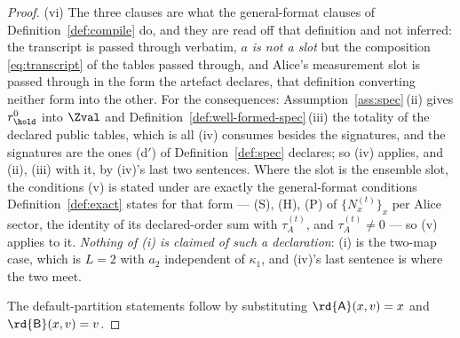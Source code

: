 \begin{proof}
(vi) The three clauses are what the general-format clauses of
Definition~\ref{def:compile} do, and they are read off that definition and
not inferred: the transcript is passed through verbatim, \emph{$a$ is not a
slot} but the composition \eqref{eq:transcript} of the tables passed through,
and Alice's measurement slot is passed through in the form the artefact
declares, that definition converting neither form into the other. For the
consequences: Assumption~\ref{ass:spec}\,(ii) gives $r^{0}_{\hold}$ into
$\Zval$ and Definition~\ref{def:well-formed-spec}\,(iii) the totality of the
declared public tables, which is all (iv) consumes
besides the signatures, and the signatures are the ones (d$'$) of
Definition~\ref{def:spec} declares; so (iv) applies, and (ii), (iii) with it,
by (iv)'s last two sentences. Where the slot is the ensemble slot, the
conditions (v) is stated under are exactly the general-format conditions
Definition~\ref{def:exact} states for that form --- (S), (H), (P) of
$\{N^{(t)}_x\}_x$ per Alice sector, the identity of its declared-order sum
with $\tau^{(t)}_A$, and $\tau^{(t)}_A\ne0$ --- so (v) applies to it.
\emph{Nothing of (i) is claimed of such a declaration}: (i) is the two-map
case, which is $L=2$ with $a_2$ independent of $\kappa_1$, and (iv)'s last
sentence is where the two meet.

The default-partition statements follow by substituting
$\rd{\mathsf A}(x,v)=x$ and $\rd{\mathsf B}(x,v)=v$.
\end{proof}

